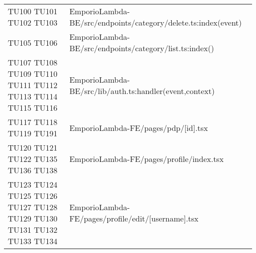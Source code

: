 {\begin{longtable}{C{2cm} C{12.8cm}}
TU100 \newline TU101 \newline TU102 \newline TU103 & EmporioLambda-BE/src/endpoints/category/delete.ts:index(event)\\

TU105 \newline TU106 & EmporioLambda-BE/src/endpoints/category/list.ts:index()\\

TU107 \newline TU108 \newline TU109 \newline TU110 \newline TU111 \newline TU112 \newline TU113 \newline TU114 \newline TU115 \newline TU116 & EmporioLambda-BE/src/lib/auth.ts:handler(event,context)\\

TU117 \newline TU118 \newline TU119 \newline TU191 & EmporioLambda-FE/pages/pdp/[id].tsx\\

TU120 \newline TU121 \newline TU122 \newline TU135 \newline TU136 \newline TU138 & EmporioLambda-FE/pages/profile/index.tsx\\

TU123 \newline TU124 \newline TU125 \newline TU126 \newline TU127 \newline TU128 \newline TU129 \newline TU130 \newline TU131 \newline TU132 \newline TU133 \newline TU134  & EmporioLambda-FE/pages/profile/edit/[username].tsx\\


\end{longtable}}
